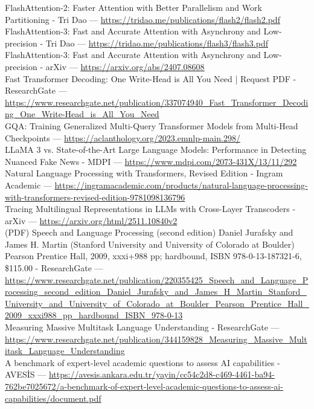 \documentclass[11pt,a4paper]{article}
\begin{document}
\noindent [17] FlashAttention-2: Faster Attention with Better Parallelism and Work Partitioning - Tri Dao --- \url{https://tridao.me/publications/flash2/flash2.pdf}\\
\noindent [19] FlashAttention-3: Fast and Accurate Attention with Asynchrony and Low-precision - Tri Dao --- \url{https://tridao.me/publications/flash3/flash3.pdf}\\
\noindent [20] FlashAttention-3: Fast and Accurate Attention with Asynchrony and Low-precision - arXiv --- \url{https://arxiv.org/abs/2407.08608}\\
\noindent [22] Fast Transformer Decoding: One Write-Head is All You Need | Request PDF - ResearchGate --- \url{https://www.researchgate.net/publication/337074940_Fast_Transformer_Decoding_One_Write-Head_is_All_You_Need}\\
\noindent [24] GQA: Training Generalized Multi-Query Transformer Models from Multi-Head Checkpoints --- \url{https://aclanthology.org/2023.emnlp-main.298/}\\
\noindent [27] LLaMA 3 vs. State-of-the-Art Large Language Models: Performance in Detecting Nuanced Fake News - MDPI --- \url{https://www.mdpi.com/2073-431X/13/11/292}\\
\noindent [28] Natural Language Processing with Transformers, Revised Edition - Ingram Academic --- \url{https://ingramacademic.com/products/natural-language-processing-with-transformers-revised-edition-9781098136796}\\
\noindent [31] Tracing Multilingual Representations in LLMs with Cross-Layer Transcoders - arXiv --- \url{https://arxiv.org/html/2511.10840v2}\\
\noindent [33] (PDF) Speech and Language Processing (second edition) Daniel Jurafsky and James H. Martin (Stanford University and University of Colorado at Boulder) Pearson Prentice Hall, 2009, xxxi+988 pp; hardbound, ISBN 978-0-13-187321-6, \$115.00 - ResearchGate --- \url{https://www.researchgate.net/publication/220355425_Speech_and_Language_Processing_second_edition_Daniel_Jurafsky_and_James_H_Martin_Stanford_University_and_University_of_Colorado_at_Boulder_Pearson_Prentice_Hall_2009_xxxi988_pp_hardbound_ISBN_978-0-13}\\
\noindent [35] Measuring Massive Multitask Language Understanding - ResearchGate --- \url{https://www.researchgate.net/publication/344159828_Measuring_Massive_Multitask_Language_Understanding}\\
\noindent [37] A benchmark of expert-level academic questions to assess AI capabilities - AVESİS --- \url{https://avesis.ankara.edu.tr/yayin/cc54c2d8-c469-4461-ba94-762be7025672/a-benchmark-of-expert-level-academic-questions-to-assess-ai-capabilities/document.pdf}\\
\end{document}
